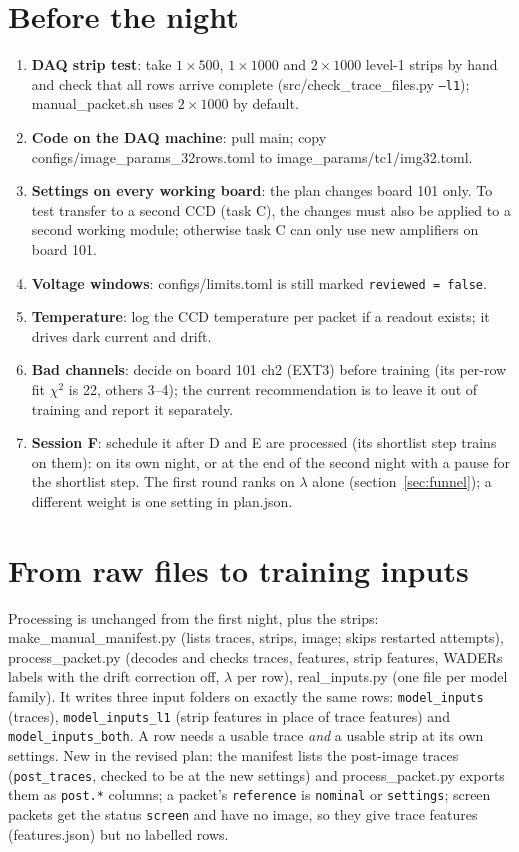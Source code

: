 \documentclass[11pt]{article}
\begin{document}
\section{Before the night}
\begin{enumerate}
\item \textbf{DAQ strip test}: take $1\times500$, $1\times1000$ and $2\times1000$ level-1 strips by hand and check that all
  rows arrive complete (src/check\_trace\_files.py \texttt{--l1}); manual\_packet.sh uses $2\times1000$ by default.
\item \textbf{Code on the DAQ machine}: pull main; copy configs/image\_params\_32rows.toml to
  image\_params/tc1/img32.toml.
\item \textbf{Settings on every working board}: the plan changes board 101 only. To test transfer to a second CCD
  (task C), the changes must also be applied to a second working module; otherwise task C can only use new amplifiers
  on board 101.
\item \textbf{Voltage windows}: configs/limits.toml is still marked \texttt{reviewed = false}.
\item \textbf{Temperature}: log the CCD temperature per packet if a readout exists; it drives dark current and drift.
\item \textbf{Bad channels}: decide on board 101 ch2 (EXT3) before training (its per-row fit $\chi^2$ is 22, others
  3--4); the current recommendation is to leave it out of training and report it separately.
\item \textbf{Session F}: schedule it after D and E are processed (its shortlist step trains on them): on its own
  night, or at the end of the second night with a pause for the shortlist step. The first round ranks on $\lambda$ alone
  (section~\ref{sec:funnel}); a different weight is one setting in plan.json.
\end{enumerate}

\section{From raw files to training inputs}

Processing is unchanged from the first night, plus the strips: make\_manual\_manifest.py (lists traces, strips, image;
skips restarted attempts), process\_packet.py (decodes and checks traces, features, strip features, WADERs labels with
the drift correction off, $\lambda$ per row), real\_inputs.py (one file per model family). It writes three input folders on
exactly the same rows: \texttt{model\_inputs} (traces), \texttt{model\_inputs\_l1} (strip features in place of trace
features) and \texttt{model\_inputs\_both}. A row needs a usable trace \emph{and} a usable strip at its own settings.
New in the revised plan: the manifest lists the post-image traces (\texttt{post\_traces}, checked to be at the new
settings) and process\_packet.py exports them as \texttt{post.*} columns; a packet's \texttt{reference} is
\texttt{nominal} or \texttt{settings}; screen packets get the status \texttt{screen} and have no image, so they give
trace features (features.json) but no labelled rows.
\end{document}
